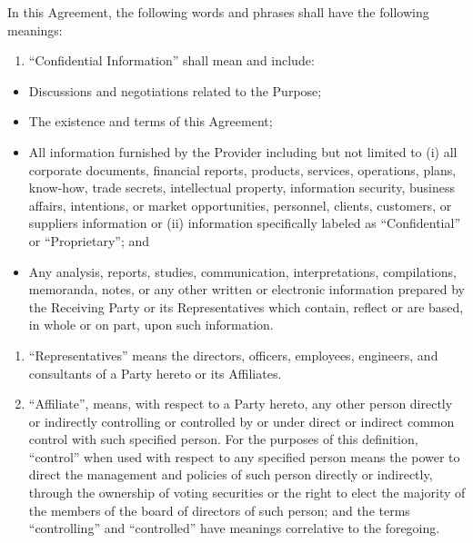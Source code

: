 \documentclass[11pt,a4paper]{article} %
\providecommand{\tightlist}{%
  \setlength{\itemsep}{0pt}\setlength{\parskip}{0pt}}
\begin{document}
In this Agreement, the following words and phrases shall have the
following meanings:

\begin{enumerate}
\def\labelenumi{(\alph{enumi})}
\tightlist
\item
  ``Confidential Information'' shall mean and include:
\end{enumerate}

\begin{itemize}
\tightlist
\item
  Discussions and negotiations related to the Purpose;
\item
  The existence and terms of this Agreement;
\item
  All information furnished by the Provider including but not limited to
  (i) all corporate documents, financial reports, products, services,
  operations, plans, know-how, trade secrets, intellectual property,
  information security, business affairs, intentions, or market
  opportunities, personnel, clients, customers, or suppliers information
  or (ii) information specifically labeled as ``Confidential'' or
  ``Proprietary''; and
\item
  Any analysis, reports, studies, communication, interpretations,
  compilations, memoranda, notes, or any other written or electronic
  information prepared by the Receiving Party or its Representatives
  which contain, reflect or are based, in whole or on part, upon such
  information.
\end{itemize}

\begin{enumerate}
\def\labelenumi{(\alph{enumi})}
\setcounter{enumi}{1}
\item
  ``Representatives'' means the directors, officers, employees,
  engineers, and consultants of a Party hereto or its Affiliates.
\item
  ``Affiliate'', means, with respect to a Party hereto, any other person
  directly or indirectly controlling or controlled by or under direct or
  indirect common control with such specified person. For the purposes
  of this definition, ``control'' when used with respect to any
  specified person means the power to direct the management and policies
  of such person directly or indirectly, through the ownership of voting
  securities or the right to elect the majority of the members of the
  board of directors of such person; and the terms ``controlling'' and
  ``controlled'' have meanings correlative to the foregoing.
\end{enumerate}
\end{document}
